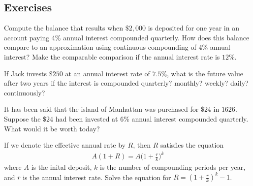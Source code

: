 \documentclass[10pt,]{book}
\theoremstyle{ptxdefinitionnotitle}
\theoremstyle{ptxdefinitiontitle}
\theoremstyle{ptxdefinitionnotitle}
\theoremstyle{ptxdefinitiontitle}
\theoremstyle{ptxdefinitionnotitle}
\theoremstyle{ptxdefinitiontitle}
\numberwithin{equation}{section}
\begin{document}
\subsection[{Exercises}]{Exercises}\label{exercises-8}
\begin{divisionexercise}{1}\hypertarget{exercise-50}{}
\hypertarget{p-222}{}%
Compute the balance that results when \(\$2,000\) is deposited for one year in an account paying \(4\%\) annual interest compounded quarterly.  How does this balance compare to an approximation using continuous compounding of \(4\%\) annual interest? Make the comparable comparison if the annual interest rate is \(12\%\).%
\end{divisionexercise}%
\begin{divisionexercise}{2}\hypertarget{exercise-51}{}
\hypertarget{p-223}{}%
If Jack invests \(\$250\) at an annual interest rate of \(7.5\%\), what is the future value after two years if the interest is compounded quarterly? monthly? weekly? daily? continuously?%
\end{divisionexercise}%
\begin{divisionexercise}{3}\hypertarget{exercise-52}{}
\leavevmode%
\end{divisionexercise}%
\begin{divisionexercise}{4}\hypertarget{exercise-53}{}
\hypertarget{p-224}{}%
It has been said that the island of Manhattan was purchased for \(\$24\) in \(1626\).  Suppose the \(\$24\) had been invested at \(6\%\) annual interest compounded quarterly.  What would it be worth today?%
\end{divisionexercise}%
\begin{divisionexercise}{5}\hypertarget{exercise-54}{}
\hypertarget{p-225}{}%
If we denote the effective annual rate by \(R\), then \(R\) satisfies the equation%
%
\begin{gather*}
A(1 + R) = A \bigg(1 + \frac{r}{k}\bigg)^k
\end{gather*}
\hypertarget{p-226}{}%
where \(A\) is the inital deposit, \(k\) is the number of compounding periods per year, and \(r\) is the annual interest rate. Solve the equation for \(R=(1 + \frac{r}{k})^k - 1\).%
\end{divisionexercise}%
\end{document}
